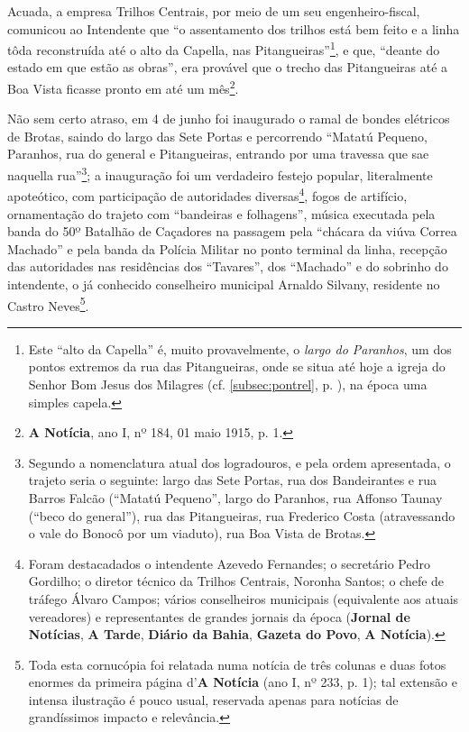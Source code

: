 Acuada, a empresa Trilhos Centrais, por meio de um seu engenheiro-fiscal, comunicou ao Intendente que ``o assentamento dos trilhos está bem feito e a linha tôda reconstruída até o alto da Capella, nas Pitangueiras''\footnote{Este ``alto da Capella'' é, muito provavelmente, o \textit{largo do Paranhos}, um dos pontos extremos da rua das Pitangueiras, onde se situa até hoje a igreja do Senhor Bom Jesus dos Milagres (cf. \autoref{subsec:pontrel}, p. \pageref{subsec:pontrel}), na época uma simples capela.}, e que, ``deante do estado em que estão as obras'', era provável que o trecho das Pitangueiras até a Boa Vista ficasse pronto em até um mês\footnote{\textbf{A Notícia}, ano I, nº 184, 01 maio 1915, p. 1.}. 

Não sem certo atraso, em 4 de junho foi inaugurado o ramal de bondes elétricos de Brotas, saindo do largo das Sete Portas e percorrendo ``Matatú Pequeno, Paranhos, rua do general e Pitangueiras, entrando por uma travessa que sae naquella rua''\footnote{Segundo a nomenclatura atual dos logradouros, e pela ordem apresentada, o trajeto seria o seguinte: largo das Sete Portas, rua dos Bandeirantes e rua Barros Falcão (``Matatú Pequeno'', largo do Paranhos, rua Affonso Taunay (``beco do general''), rua das Pitangueiras, rua Frederico Costa (atravessando o vale do Bonocô por um viaduto), rua Boa Vista de Brotas.}; a inauguração foi um verdadeiro festejo popular, literalmente apoteótico, com participação de autoridades diversas\footnote{Foram destacadados o intendente Azevedo Fernandes; o secretário Pedro Gordilho; o diretor técnico da Trilhos Centrais, Noronha Santos; o chefe de tráfego Álvaro Campos; vários conselheiros municipais (equivalente aos atuais vereadores) e representantes de grandes jornais da época (\textbf{Jornal de Notícias}, \textbf{A Tarde}, \textbf{Diário da Bahia}, \textbf{Gazeta do Povo}, \textbf{A Notícia}).}, fogos de artifício, ornamentação do trajeto com  ``bandeiras e folhagens'', música executada pela banda do 50º Batalhão de Caçadores na passagem pela ``chácara da viúva Correa Machado'' e pela banda da Polícia Militar no ponto terminal da linha, recepção das autoridades nas residências dos ``Tavares'', dos ``Machado'' e do sobrinho do intendente, o já conhecido conselheiro municipal Arnaldo Silvany, residente no Castro Neves\footnote{Toda esta cornucópia foi relatada numa notícia de três colunas e duas fotos enormes da primeira página d'\textbf{A Notícia} (ano I, nº 233, p. 1); tal extensão e intensa ilustração é pouco usual, reservada apenas para notícias de grandíssimos impacto e relevância.}. 

